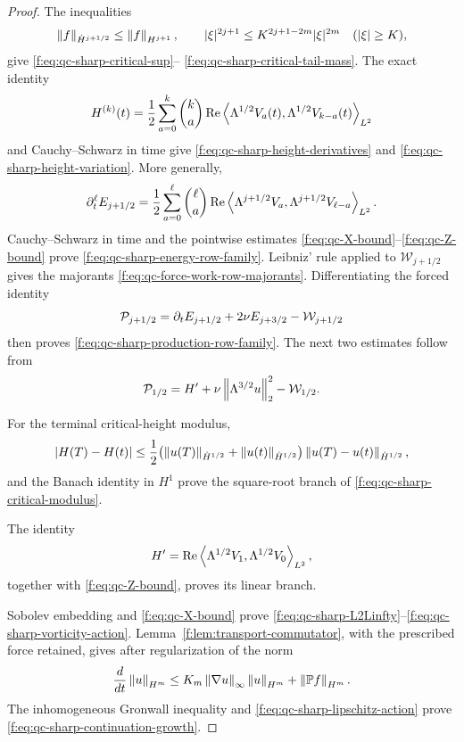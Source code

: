 {\begin{proof}
The inequalities
\[
 \left\lVert f\right\rVert_{\dot H^{j+1/2}}\le\left\lVert f\right\rVert_{H^{j+1}},
 \qquad
 |\xi|^{2j+1}\le K^{2j+1-2m}|\xi|^{2m}
 \quad(|\xi|\ge K),
\]
give \eqref{f:eq:qc-sharp-critical-sup}--%
\eqref{f:eq:qc-sharp-critical-tail-mass}.  The exact identity
\[
 H^{(k)}(t)=\frac12\sum_{a=0}^{k}\binom ka
 \operatorname{Re}\left\langle \Lambda^{1/2}V_a(t),\Lambda^{1/2}V_{k-a}(t)\right\rangle_{L^2}
\]
and Cauchy--Schwarz in time give
\eqref{f:eq:qc-sharp-height-derivatives} and
\eqref{f:eq:qc-sharp-height-variation}.  More generally,
\[
 \partial_t^\ell E_{j+1/2}
 =\frac12\sum_{a=0}^{\ell}\binom\ell a
 \operatorname{Re}\left\langle \Lambda^{j+1/2}V_a,\Lambda^{j+1/2}V_{\ell-a}\right\rangle_{L^2}.
\]
Cauchy--Schwarz in time and the pointwise estimates
\eqref{f:eq:qc-X-bound}--\eqref{f:eq:qc-Z-bound} prove
\eqref{f:eq:qc-sharp-energy-row-family}.  Leibniz' rule applied to
\(\mathcal W_{j+1/2}\) gives the majorants
\eqref{f:eq:qc-force-work-row-majorants}.  Differentiating the forced identity
\[
 \mathcal P_{j+1/2}=\partial_tE_{j+1/2}+2\nu E_{j+3/2}
 -\mathcal W_{j+1/2}
\]
then proves \eqref{f:eq:qc-sharp-production-row-family}.  The next two
estimates follow from
\[
 \mathcal P_{1/2}=H'+\nu\left\lVert \Lambda^{3/2}u\right\rVert_2^2
 -\mathcal W_{1/2}.
\]
\begin{samepage}
For the terminal critical-height modulus,
\[
 |H(T)-H(t)|
 \le\frac12\bigl(
 \left\lVert u(T)\right\rVert_{\dot H^{1/2}}+\left\lVert u(t)\right\rVert_{\dot H^{1/2}}
 \bigr)\left\lVert u(T)-u(t)\right\rVert_{\dot H^{1/2}},
\]
and the Banach identity in \(H^1\) prove the square-root branch of
\eqref{f:eq:qc-sharp-critical-modulus}.
\par
\end{samepage}
The identity
\[
 H'=\operatorname{Re}
 \left\langle \Lambda^{1/2}V_1,\Lambda^{1/2}V_0\right\rangle_{L^2},
\]
together with \eqref{f:eq:qc-Z-bound}, proves its linear branch.

Sobolev embedding and \eqref{f:eq:qc-X-bound} prove
\eqref{f:eq:qc-sharp-L2Linfty}--\eqref{f:eq:qc-sharp-vorticity-action}.
Lemma~\ref{f:lem:transport-commutator}, with the prescribed force retained,
gives after regularization of the norm
\[
 \frac d{dt}\left\lVert u\right\rVert_{H^m}
 \le K_m\left\lVert \nabla u\right\rVert_\infty\left\lVert u\right\rVert_{H^m}
 +\left\lVert \mathbb P f\right\rVert_{H^m}.
\]
The inhomogeneous Gronwall inequality and \eqref{f:eq:qc-sharp-lipschitz-action} prove
\eqref{f:eq:qc-sharp-continuation-growth}.
\end{proof}
}
